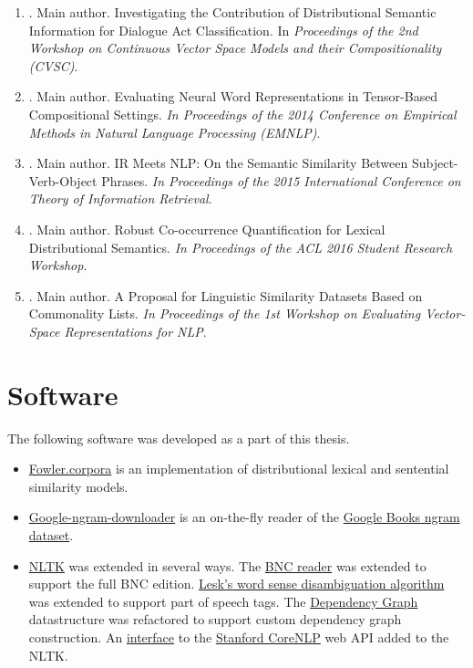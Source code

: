 \begin{enumerate}
\item \citet*{milajevs-purver:2014:CVSC}. Main author. Investigating the
  Contribution of Distributional Semantic Information for Dialogue Act
  Classification. In \textit{Proceedings of the 2nd Workshop on Continuous Vector Space Models and their Compositionality (CVSC)}.
\item \citet*{milajevs-EtAl:2014:EMNLP2014}. Main author. Evaluating Neural Word
  Representations in Tensor-Based Compositional Settings. \textit{In Proceedings of the 2014 Conference on Empirical Methods in Natural Language Processing (EMNLP)}.
\item \citet*{Milajevs:2015:IMN:2808194.2809448}. Main author. IR Meets NLP: On
  the Semantic Similarity Between Subject-Verb-Object Phrases. \textit{In Proceedings of the 2015 International Conference on Theory of Information Retrieval}.
\item \citet*{milajevs-sadrzadeh-purver:2016:ACL-SRW}. Main author. Robust Co-occurrence Quantification for Lexical Distributional Semantics. \textit{In Proceedings of the ACL 2016 Student Research Workshop}.
\item \citet*{milajevs-griffiths:2016:repeval}. Main author. A Proposal for Linguistic Similarity Datasets Based on Commonality Lists. \textit{In Proceedings of the 1st Workshop on Evaluating Vector-Space Representations for NLP}.
\end{enumerate}

\chapter*{Software}

The following software was developed as a part of this thesis.
\begin{itemize}
\item \href{http://fowlercorpora.readthedocs.io/en/latest/}{Fowler.corpora} is an implementation of distributional lexical and sentential similarity models.
\item \href{https://pypi.python.org/pypi/google-ngram-downloader}{Google-ngram-downloader} is an on-the-fly reader of the \href{http://storage.googleapis.com/books/ngrams/books/datasetsv2.html}{Google Books ngram dataset}.
\item \href{http://www.nltk.org/}{NLTK} was extended in several ways. The \href{https://github.com/nltk/nltk/blob/develop/nltk/corpus/reader/bnc.py}{BNC reader} was extended to support the full BNC edition. \href{https://github.com/nltk/nltk/blob/develop/nltk/wsd.py}{Lesk's word sense disambiguation algorithm} was extended to support part of speech tags. The \href{https://github.com/nltk/nltk/blob/develop/nltk/parse/dependencygraph.py}{Dependency Graph} datastructure was refactored to support custom dependency graph construction. An \href{https://github.com/nltk/nltk/pull/1249}{interface} to the \href{http://stanfordnlp.github.io/CoreNLP/}{Stanford CoreNLP} web API added to the NLTK.
\end{itemize}

